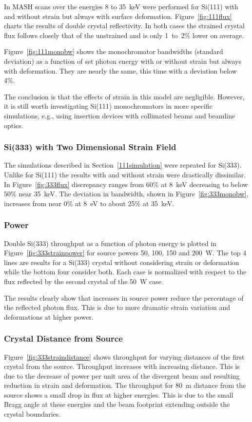 \documentclass{iucr}
\begin{document}
In MASH scans over the energies 8 to 35~keV were performed for Si(111) with and without strain but always with surface deformation. Figure~\ref{fig:111flux} charts the results of double crystal reflectivity. In both cases the strained crystal flux follows closely that of the unstrained and is only 1~to~2\% lower on average.

Figure~\ref{fig:111monobw} shows the monochromator bandwidths (standard deviation) as a function of set photon energy with or without strain but always with deformation. They are nearly the same, this time with a deviation below 4\%.

The conclusion is that the effects of strain in this model are negligible. However, it is still worth investigating Si(111) monochromators in more specific simulations, e.g., using insertion devices with collimated beams and beamline optics.

\subsubsection{Si(333) with Two Dimensional Strain Field}\label{parameterscans}

The simulations described in Section~\ref{111simulation} were repeated for Si(333). Unlike for Si(111) the results with and without strain were drastically dissimilar. In Figure~\ref{fig:333flux} discrepancy ranges from 60\% at 8~keV decreasing to below 50\% near 35~keV. The deviation in bandwidth, shown in Figure~\ref{fig:333monobw}, increases from near 0\% at 8~eV to about 25\% at 35~keV.

\subsubsection{Power}
Double Si(333) throughput as a function of photon energy is plotted in Figure~\ref{fig:333strainpower} for source powers 50, 100, 150 and 200~W. The top 4 lines are results for a Si(333) crystal without considering strain or deformation while the bottom four consider both. Each case is normalized with respect to the flux reflected by the second crystal of the 50~W case.

The results clearly show that increases in source power reduce the percentage of the reflected photon flux. This is due to more dramatic strain variation and deformations at higher power.

\subsubsection{Crystal Distance from Source}
Figure~\ref{fig:333straindistance} shows throughput for varying distances of the first crystal from the source. Throughput increases with increasing distance. This is due to the decrease of power per unit area of the divergent beam and resulting reduction in strain and deformation. The throughput for 80~m distance from the source shows a small drop in flux at higher energies. This is due to the small Bragg angle at these energies and the beam footprint extending outside the crystal boundaries.
\end{document}
